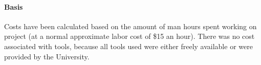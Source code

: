 \documentclass{article}
\begin{document}
\paragraph{Basis} Costs have been calculated based on the amount of man hours spent working on project (at a normal approximate labor cost of \$15 an hour). There was no cost associated with tools, because all tools used were either freely available or were provided by the University.

\clearpage

\listoffigures
\clearpage
\end{document}
